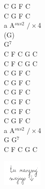 \documentclass[a5paper, 10pt]{book}
\begin{document}
\begin{minipage}[t]{0.2\textwidth}
  C G F C\\
  C G F C\\

  a A$^{sus2}$ $/ \times$4\\
  (G)\\
  G$^7$\\

  C F C G C\\
  C F C G C\\

  C G F C\\
  C G F C\\

  C G F C\\
  C G F C\\

  C G F C\\
  C G F C\\

  a A$^{sus2}$ $/ \times$4\\
  G G$^7$\\

  C F C G C\\
\end{minipage}
\includegraphics[width=0.15\textwidth, center]{images/pila.png}\\

\newpage
\end{document}
